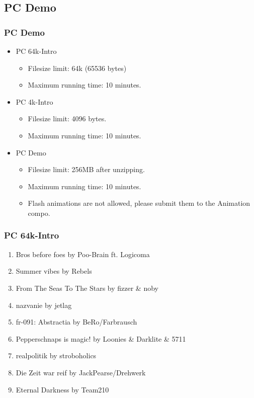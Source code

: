\documentclass{beamer}
\begin{document}
\subsection{PC Demo}
\begin{frame}
  \frametitle{PC Demo}
  \begin{itemize}
  \item PC 64k-Intro
    \begin{itemize}
    \item Filesize limit: 64k (65536 bytes)
    \item Maximum running time: 10 minutes.
    \end{itemize}
  \item PC 4k-Intro
    \begin{itemize}
    \item Filesize limit: 4096 bytes.
    \item Maximum running time: 10 minutes.
    \end{itemize}
  \item PC Demo
    \begin{itemize}
    \item Filesize limit: 256MB after unzipping.
    \item Maximum running time: 10 minutes.
    \item Flash animations are not allowed, please submit them to the Animation compo.
    \end{itemize}
  \end{itemize}
\end{frame}

\begin{frame}
  \frametitle{PC 64k-Intro}
  \begin{enumerate}
  \item Bros before foes by Poo-Brain ft. Logicoma
  \item Summer vibes by Rebels
  \item From The Seas To The Stars by fizzer \& noby
  \item nazvanie by jetlag
  \item fr-091: Abstractia by BeRo/Farbrausch
  \item Pepperschnaps is magic! by Loonies \& Darklite \& 5711
  \item realpolitik by stroboholics
  \item Die Zeit war reif by JackPearse/Drehwerk
  \item Eternal Darkness by Team210
  \end{enumerate}
\end{frame}
\end{document}

